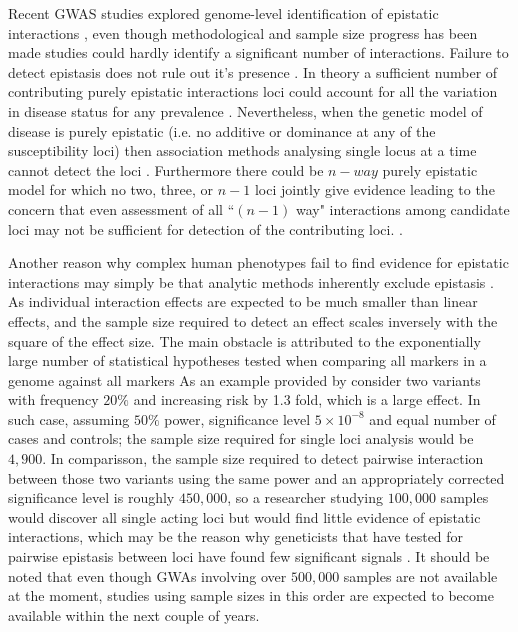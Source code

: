 Recent GWAS studies explored genome-level identification of epistatic interactions \cite{ackermann2012systematic}, even though methodological and sample size progress has been made studies could hardly identify a significant number of interactions. 
Failure to detect epistasis does not rule out it's presence \cite{zuk2012mystery}.
In theory a sufficient number of contributing purely epistatic interactions loci could account for all the variation in disease status for any prevalence \cite{culverhouse2002perspective}.
Nevertheless, when the genetic model of disease is purely epistatic (i.e. no additive or dominance at any of the susceptibility loci) then association methods analysing single locus at a time cannot detect the loci \cite{culverhouse2002perspective}.
Furthermore there could be $n-way$ purely epistatic model for which no two, three, or $n-1$ loci jointly give evidence leading to the concern that even assessment of all ``$(n-1)$ way" interactions among candidate loci may not be sufficient for detection of the contributing loci. \cite{culverhouse2002perspective}.

Another reason why complex human phenotypes fail to find evidence for epistatic interactions may simply be that analytic methods inherently exclude epistasis \cite{culverhouse2002perspective}.
As individual interaction effects are expected to be much smaller than linear effects, and the sample size required to detect an effect scales inversely with the square of the effect size. 
The main obstacle is attributed to the exponentially large number of statistical hypotheses tested when comparing all markers in a genome against all markers \cite{ackermann2012systematic}
As an example provided by \cite{zuk2012mystery} consider two variants with frequency $20\%$ and increasing risk by 1.3 fold, which is a large effect.
In such case, assuming $50\%$ power, significance level $5 \times 10^{-8}$  and equal number of cases and controls; the sample size required for single loci analysis would be $4,900$.
In comparisson, the sample size required to detect pairwise interaction between those two variants using the same power and an appropriately corrected significance level is roughly $450,000$, so a researcher studying $100,000$ samples would discover all single acting loci but would find little evidence of epistatic interactions, which may be the reason why geneticists that have tested for pairwise epistasis between loci have found few significant signals \cite{zuk2012mystery}.
It should be noted that even though GWAs involving over $500,000$ samples are not available at the moment, studies using sample sizes in this order are expected to become available within the next couple of years.


